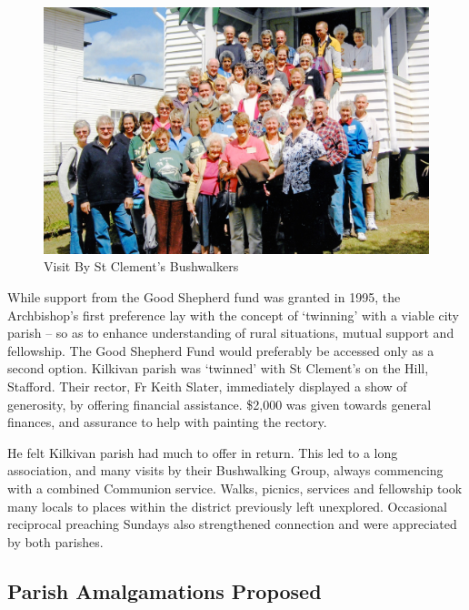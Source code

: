 \begin{figure}[!htb]
\begin{center}
\includegraphics[width=1.\textwidth,center]{../images/visitByStClementsBushwalkers.jpg}
\caption{Visit By St Clement's Bushwalkers}
\end{center}
\end{figure}




While support from the Good Shepherd fund was granted in 1995, the Archbishop's first preference lay with the concept of `twinning' with a viable city parish -- so as to enhance understanding of rural situations, mutual support and fellowship. The Good Shepherd Fund would preferably be accessed only as a second option. Kilkivan parish was `twinned' with St Clement's on the Hill, Stafford. Their rector, Fr Keith Slater, immediately displayed a show of generosity, by offering financial assistance. \$2,000 was given towards general finances, and assurance to help with painting the rectory.



He felt Kilkivan parish had much to offer in return. This led to a long association, and many visits by their Bushwalking Group, always commencing with a combined Communion service. Walks, picnics, services and fellowship took many locals to places within the district previously left unexplored. Occasional reciprocal preaching Sundays also strengthened connection and were appreciated by both parishes.



\subsection{Parish Amalgamations Proposed}



